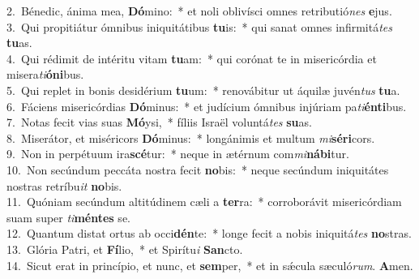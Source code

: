 {2.~}Bénedic, ánima mea, \textbf{Dó}mino:~* et noli oblivísci omnes retributió\textit{nes} \textbf{e}jus.\\
{3.~}Qui propitiátur ómnibus iniquitátibus \textbf{tu}is:~* qui sanat omnes infirmitá\textit{tes} \textbf{tu}as.\\
{4.~}Qui rédimit de intéritu vitam \textbf{tu}am:~* qui corónat te in misericórdia et misera\textit{ti}\textbf{ó}\textbf{ni}bus.\\
{5.~}Qui replet in bonis desidérium \textbf{tu}um:~* renovábitur ut áquilæ juvén\textit{tus} \textbf{tu}a.\\
{6.~}Fáciens misericórdias \textbf{Dó}minus:~* et judícium ómnibus injúriam pa\textit{ti}\textbf{én}\textbf{ti}bus.\\
{7.~}Notas fecit vias suas \textbf{Mó}ysi,~* fíliis Israël voluntá\textit{tes} \textbf{su}as.\\
{8.~}Miserátor, et miséricors \textbf{Dó}minus:~* longánimis et multum \textit{mi}\textbf{sé}\textbf{ri}cors.\\
{9.~}Non in perpétuum ira\textbf{scé}tur:~* neque in ætérnum com\textit{mi}\textbf{ná}\textbf{bi}tur.\\
{10.~}Non secúndum peccáta nostra fecit \textbf{no}bis:~* neque secúndum iniquitátes nostras retríbu\textit{it} \textbf{no}bis.\\
{11.~}Quóniam secúndum altitúdinem cæli a \textbf{ter}ra:~* corroborávit misericórdiam suam super \textit{ti}\textbf{mén}\textbf{tes} se.\\
{12.~}Quantum distat ortus ab occi\textbf{dén}te:~* longe fecit a nobis iniquitá\textit{tes} \textbf{no}stras.\\
{13.~}Glória Patri, et \textbf{Fí}lio,~* et Spirítu\textit{i} \textbf{San}cto.\\
{14.~}Sicut erat in princípio, et nunc, et \textbf{sem}per,~* et in sǽcula sæculó\textit{rum}. \textbf{A}men.\\

